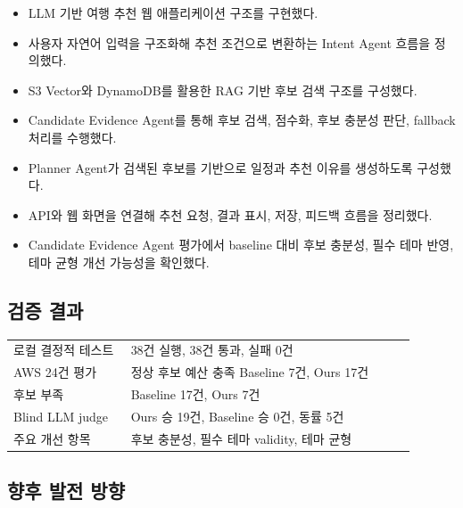 \documentclass[12pt,a4paper]{article}
\newcommand{\DocNeedspace}[1]{\par\ifdim\dimexpr\pagegoal-\pagetotal\relax<#1\newpage\fi}
\renewcommand{\arraystretch}{1.35}
\begin{document}
\begin{itemize}
\item LLM 기반 여행 추천 웹 애플리케이션 구조를 구현했다.
\item 사용자 자연어 입력을 구조화해 추천 조건으로 변환하는 Intent Agent 흐름을 정의했다.
\item S3 Vector와 DynamoDB를 활용한 RAG 기반 후보 검색 구조를 구성했다.
\item Candidate Evidence Agent를 통해 후보 검색, 점수화, 후보 충분성 판단, fallback 처리를 수행했다.
\item Planner Agent가 검색된 후보를 기반으로 일정과 추천 이유를 생성하도록 구성했다.
\item API와 웹 화면을 연결해 추천 요청, 결과 표시, 저장, 피드백 흐름을 정리했다.
\item Candidate Evidence Agent 평가에서 baseline 대비 후보 충분성, 필수 테마 반영, 테마 균형 개선 가능성을 확인했다.
\end{itemize}


\DocNeedspace{24\baselineskip}
\subsection*{검증 결과}


\DocNeedspace{16\baselineskip}
\begin{small}
\setlength{\tabcolsep}{3pt}
\setlength{\extrarowheight}{1pt}
\renewcommand{\arraystretch}{1.42}
\begin{longtable}{@{}>{\RaggedRight\arraybackslash}m{0.289\linewidth}>{\RaggedRight\arraybackslash}m{0.683\linewidth}@{}}
\toprule
\multicolumn{1}{>{\centering\arraybackslash}m{0.289\linewidth}}{\textbf{항목}} & \multicolumn{1}{>{\centering\arraybackslash}m{0.683\linewidth}}{\textbf{결과}} \\
\midrule
\endhead
로컬 결정적 테스트 & 38건 실행, 38건 통과, 실패 0건 \\
AWS 24건 평가 & 정상 후보 예산 충족 Baseline 7건, Ours 17건 \\
후보 부족 & Baseline 17건, Ours 7건 \\
Blind LLM judge & Ours 승 19건, Baseline 승 0건, 동률 5건 \\
주요 개선 항목 & 후보 충분성, 필수 테마 validity, 테마 균형 \\
\bottomrule
\end{longtable}
\end{small}


\DocNeedspace{3\baselineskip}
\subsection*{향후 발전 방향}
\end{document}
